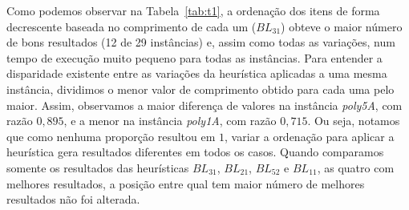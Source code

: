 \documentclass[12pt, openright, twoside, a4paper, english, brazilian]{USPSC-classe/USPSC}
\begin{document}
Como podemos observar na Tabela~\ref{tab:t1}, a ordenação dos itens de forma decrescente baseada no comprimento de cada um ($BL_{31}$) obteve o maior número de bons resultados (12 de 29 instâncias) e, assim como todas as variações, num tempo de execução muito pequeno para todas as instâncias. Para entender a disparidade existente entre as variações da heurística aplicadas a uma mesma instância, dividimos o menor valor de comprimento obtido para cada uma pelo maior. Assim, observamos a maior diferença de valores na instância {\it poly5A}, com razão $0,895$, e a menor na instância {\it poly1A}, com razão $0,715$. Ou seja, notamos que como nenhuma proporção resultou em $1$, variar a ordenação para aplicar a heurística gera resultados diferentes em todos os casos. Quando comparamos somente os resultados das heurísticas $BL_{31}$, $BL_{21}$, $BL_{52}$ e $BL_{11}$, as quatro com melhores resultados, a posição entre qual tem maior número de melhores resultados não foi alterada.
\end{document}
